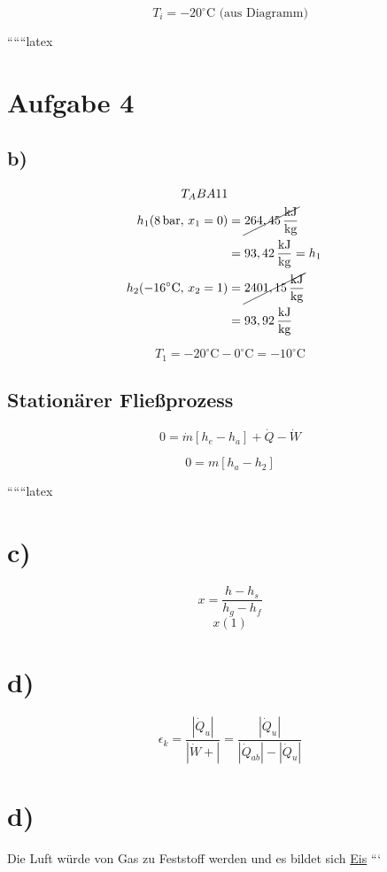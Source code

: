 \[
T_i = -20^\circ \text{C (aus Diagramm)}
\]

``````latex

\section*{Aufgabe 4}

\subsection*{b)}

\begin{align*}
    T_A B A 11 \\
    h_1 (8 \, \text{bar}, \, x_1 = 0) &= \cancel{264,45 \, \frac{\text{kJ}}{\text{kg}}} \\
    &= 93,42 \, \frac{\text{kJ}}{\text{kg}} = h_1 \\
    h_2 (-16^\circ \text{C}, \, x_2 = 1) &= \cancel{2401,15 \, \frac{\text{kJ}}{\text{kg}}} \\
    &= 93,92 \, \frac{\text{kJ}}{\text{kg}}
\end{align*}

\[
T_1 = -20^\circ \text{C} - 0^\circ \text{C} = -10^\circ \text{C}
\]

\subsection*{Stationärer Fließprozess}

\[
0 = \dot{m} \left[ h_e - h_a \right] + \dot{Q} - \dot{W}
\]

\[
0 = m \left[ h_a - h_2 \right]
\]

``````latex


\section*{c)}
\[
x = \frac{h - h_s}{h_g - h_f}
\]
\[
x(1)
\]

\section*{d)}
\[
\epsilon_k = \frac{|\dot{Q}_u|}{|\dot{W} + |} = \frac{|\dot{Q}_u|}{|\dot{Q}_{ab}| - |\dot{Q}_u|}
\]

\section*{d)}
Die Luft würde von Gas zu Feststoff werden und es bildet sich \underline{Eis}
```